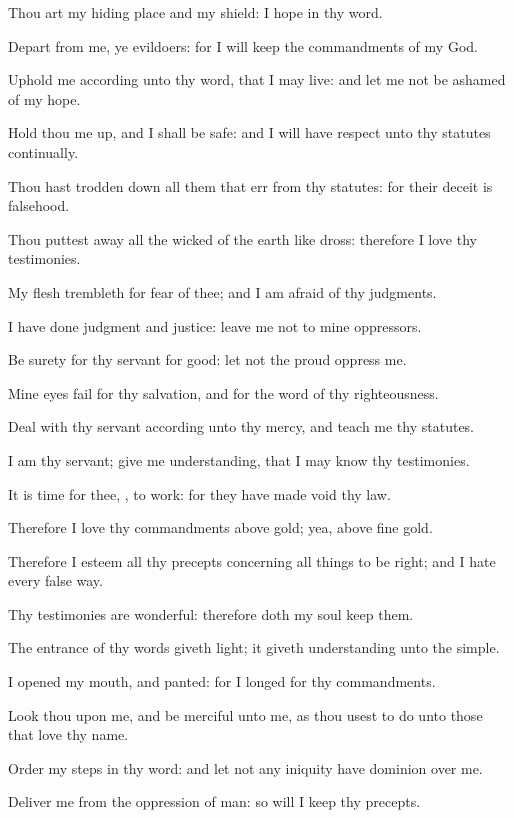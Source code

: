 \Verse Thou art my hiding place and my shield: I hope in thy word.

\Verse Depart from me, ye evildoers: for I will keep the commandments of my God.

\Verse Uphold me according unto thy word, that I may live: and let me not be ashamed of my hope.

\Verse Hold thou me up, and I shall be safe: and I will have respect unto thy statutes continually.

\Verse Thou hast trodden down all them that err from thy statutes: for their deceit is falsehood.

\Verse Thou puttest away all the wicked of the earth like dross: therefore I love thy testimonies.

\Verse My flesh trembleth for fear of thee; and I am afraid of thy judgments.

\Verse I have done judgment and justice: leave me not to mine oppressors.

\Verse Be surety for thy servant for good: let not the proud oppress me.

\Verse Mine eyes fail for thy salvation, and for the word of thy righteousness.

\Verse Deal with thy servant according unto thy mercy, and teach me thy statutes.

\Verse I am thy servant; give me understanding, that I may know thy testimonies.

\Verse It is time for thee, \LORD, to work: for they have made void thy law.

\Verse Therefore I love thy commandments above gold; yea, above fine gold.

\Verse Therefore I esteem all thy precepts concerning all things to be right; and I hate every false way.

\Verse Thy testimonies are wonderful: therefore doth my soul keep them.

\Verse The entrance of thy words giveth light; it giveth understanding unto the simple.

\Verse I opened my mouth, and panted: for I longed for thy commandments.

\Verse Look thou upon me, and be merciful unto me, as thou usest to do unto those that love thy name.

\Verse Order my steps in thy word: and let not any iniquity have dominion over me.

\Verse Deliver me from the oppression of man: so will I keep thy precepts.

